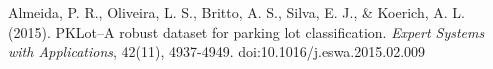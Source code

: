 \documentclass[a4paper, 11pt]{article} %
\begin{document}
\newpage
\begin{thebibliography}{unsrt}
		Almeida, P. R., Oliveira, L. S., Britto, A. S., Silva, E. J., \& Koerich, A. L. (2015). PKLot--A robust 
		dataset for parking lot classification. \textit{Expert Systems with Applications}, 42(11), 
		4937-4949. doi:10.1016/j.eswa.2015.02.009
\end{thebibliography}
\end{document}
